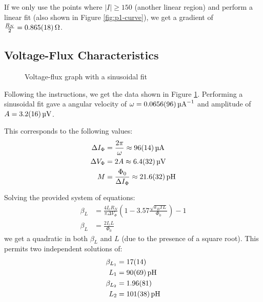 \documentclass[a4paper]{scrartcl}
\begin{document}
If we only use the points where \(|I| \ge 150\) (another linear region) and perform a linear fit (also shown in Figure \ref{fig:p1-curve}), we get a gradient of \(\frac{R_N}{2} = \SI{0.865 \pm 0.018}{\ohm}\).

\subsection{Voltage-Flux Characteristics}
\begin{figure}
    \centering
    \caption{Voltage-flux graph with a sinusoidal fit}
    \label{fig:p2-curve}
\end{figure}

Following the instructions, we get the data shown in Figure \ref{fig:p2-curve}. Performing a sinusoidal fit gave a angular velocity of \(\omega = \SI{0.0656 \pm 0.0096}{\per\micro\ampere}\) and amplitude of \(A = \SI{3.2 \pm 1.6}{\micro\volt}\).

This corresponds to the following values:
\begin{align*}
    \Delta I_\Phi &= \frac{2 \pi}{\omega} \approx \SI{96 \pm 14}{\micro\ampere} \\
    \Delta V_\Phi &= 2 A \approx \SI{6.4 \pm 3.2}{\micro\volt} \\
    M &= \frac{\Phi_0}{\Delta I_\Phi} \approx \SI{21.6 \pm 3.2}{\pico\henry}
\end{align*}

Solving the provided system of equations:
\begin{align*}
    \beta_L &= \frac{4 I_c R_N}{\pi \Delta V_\Phi} \left(1 - 3.57 \frac{\sqrt{k_B T L}}{\Phi_0}\right) - 1 \\
    \beta_L &= \frac{2 I_c L}{\Phi_0}
\end{align*}
we get a quadratic in both \(\beta_L\) and \(L\) (due to the presence of a square root). This permits two independent solutions of:
\begin{align*}
    \beta_{L_1} &= \SI{17 \pm 14}{} \\
    L_1 &= \SI{90 \pm 69}{\pico\henry} \\
    \beta_{L_2} &= \SI{1.96 \pm 0.81}{} \\
    L_2 &= \SI{101 \pm 38}{\pico\henry}
\end{align*}
\end{document}
